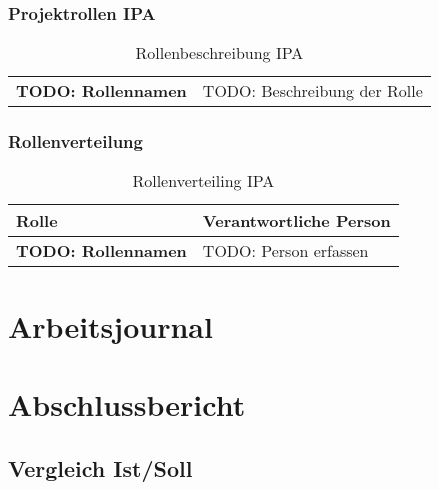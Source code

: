 \subsection{Projektrollen IPA}

\begin{table}[H]
    \begin{tabular}{|L{0.3\textwidth}|L{0.65\textwidth}|}
        \hline
          \\[12pt]
        \hline
        \textbf{TODO: Rollennamen} & TODO: Beschreibung der Rolle \\
        \hline
    \end{tabular}
    \caption{Rollenbeschreibung IPA}
\end{table}

\subsection{Rollenverteilung}

\begin{table}[H]
    \begin{tabular}{|L{0.3\textwidth}|L{0.65\textwidth}|}
        \hline
        \color{white}Rolle &\color{white} Verantwortliche Person \\
        \hline
        \textbf{TODO: Rollennamen} & TODO: Person erfassen \\
        \hline
    \end{tabular}
    \caption{Rollenverteiling IPA}
\end{table}






\chapter{Arbeitsjournal}











\chapter{Abschlussbericht}

\section{Vergleich Ist/Soll}

